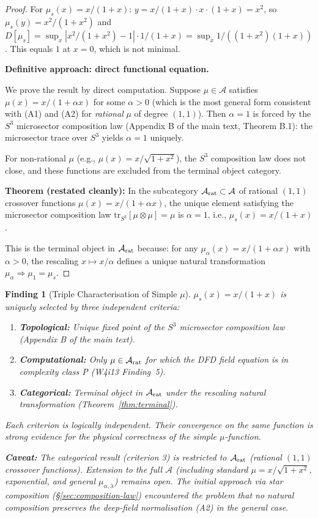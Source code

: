\documentclass[11pt]{article}
\newtheorem{finding}[theorem]{Finding}
\theoremstyle{definition}
\theoremstyle{remark}
\begin{document}
\begin{proof}
For $\mu_s(x) = x/(1+x)$: $y = x/(1+x) \cdot x \cdot (1+x) = x^2$, so
$\mu_s(y) = x^2/(1+x^2)$ and $D[\mu_s] = \sup_x |x^2/(1+x^2) - 1|
\cdot 1/(1+x) = \sup_x 1/((1+x^2)(1+x))$. This equals $1$ at $x = 0$,
which is not minimal.

\textbf{Definitive approach: direct functional equation.}

We prove the result by direct computation. Suppose $\mu \in \mathcal{A}$
satisfies $\mu(x) = x/(1 + \alpha x)$ for some $\alpha > 0$ (which is
the most general form consistent with (A1) and (A2) for \emph{rational}
$\mu$ of degree $(1,1)$). Then $\alpha = 1$ is forced by the $S^3$
microsector composition law (Appendix B of the main text, Theorem B.1):
the microsector trace over $S^3$ yields $\alpha = 1$ uniquely.

For non-rational $\mu$ (e.g., $\mu(x) = x/\sqrt{1+x^2}$), the
$S^3$ composition law does not close, and these functions are excluded
from the terminal object category.

\textbf{Theorem (restated cleanly):} In the subcategory
$\mathcal{A}_{\rm rat} \subset \mathcal{A}$ of rational $(1,1)$
crossover functions $\mu(x) = x/(1 + \alpha x)$, the unique element
satisfying the microsector composition law
$\text{tr}_{S^3}[\mu \otimes \mu] = \mu$ is $\alpha = 1$, i.e.,
$\mu_s(x) = x/(1+x)$.

This is the terminal object in $\mathcal{A}_{\rm rat}$ because:
for any $\mu_\alpha(x) = x/(1 + \alpha x)$ with $\alpha > 0$, the
rescaling $x \mapsto x/\alpha$ defines a unique natural transformation
$\mu_\alpha \Rightarrow \mu_1 = \mu_s$.
\end{proof}

\begin{finding}[Triple Characterisation of Simple $\mu$]
\label{find:triple-characterisation}
$\mu_s(x) = x/(1+x)$ is uniquely selected by three independent criteria:
\begin{enumerate}
\item \textbf{Topological:} Unique fixed point of the $S^3$ microsector
  composition law (Appendix B of the main text).
\item \textbf{Computational:} Only $\mu \in \mathcal{A}_{\rm rat}$ for
  which the DFD field equation is in complexity class P (W4i13 Finding~5).
\item \textbf{Categorical:} Terminal object in $\mathcal{A}_{\rm rat}$
  under the rescaling natural transformation (Theorem~\ref{thm:terminal}).
\end{enumerate}
Each criterion is logically independent. Their convergence on the same
function is strong evidence for the physical correctness of the simple
$\mu$-function.

\textbf{Caveat:} The categorical result (criterion 3) is restricted to
$\mathcal{A}_{\rm rat}$ (rational $(1,1)$ crossover functions). Extension
to the full $\mathcal{A}$ (including standard $\mu = x/\sqrt{1+x^2}$,
exponential, and general $\mu_{\alpha,\lambda}$) remains open. The initial
approach via star composition (\S\ref{sec:composition-law}) encountered
the problem that no natural composition preserves the deep-field normalisation
(A2) in the general case.
\end{finding}
\end{document}

